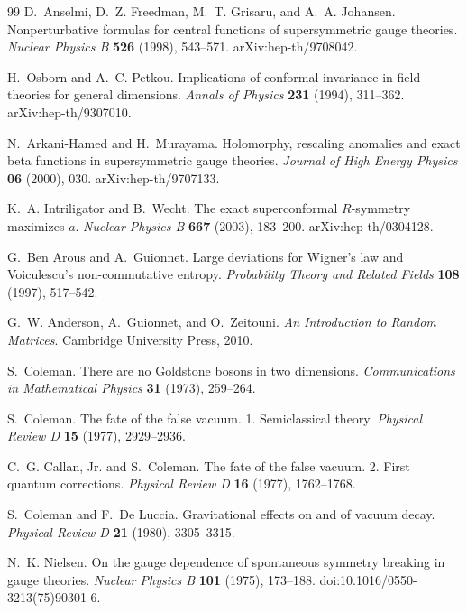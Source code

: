 \begin{thebibliography}{99}
D.~Anselmi, D.~Z. Freedman, M.~T. Grisaru, and A.~A. Johansen.
Nonperturbative formulas for central functions of supersymmetric gauge
theories.
\emph{Nuclear Physics B} \textbf{526} (1998), 543--571.
arXiv:hep-th/9708042.

H.~Osborn and A.~C. Petkou.
Implications of conformal invariance in field theories for general dimensions.
\emph{Annals of Physics} \textbf{231} (1994), 311--362.
arXiv:hep-th/9307010.

N.~Arkani-Hamed and H.~Murayama.
Holomorphy, rescaling anomalies and exact beta functions in supersymmetric
gauge theories.
\emph{Journal of High Energy Physics} \textbf{06} (2000), 030.
arXiv:hep-th/9707133.

K.~A. Intriligator and B.~Wecht.
The exact superconformal \(R\)-symmetry maximizes \(a\).
\emph{Nuclear Physics B} \textbf{667} (2003), 183--200.
arXiv:hep-th/0304128.

G.~Ben Arous and A.~Guionnet.
Large deviations for Wigner's law and Voiculescu's non-commutative entropy.
\emph{Probability Theory and Related Fields} \textbf{108} (1997), 517--542.

G.~W. Anderson, A.~Guionnet, and O.~Zeitouni.
\emph{An Introduction to Random Matrices}.
Cambridge University Press, 2010.

S.~Coleman.
There are no Goldstone bosons in two dimensions.
\emph{Communications in Mathematical Physics} \textbf{31} (1973), 259--264.

S.~Coleman.
The fate of the false vacuum. 1. Semiclassical theory.
\emph{Physical Review D} \textbf{15} (1977), 2929--2936.

C.~G. Callan, Jr. and S.~Coleman.
The fate of the false vacuum. 2. First quantum corrections.
\emph{Physical Review D} \textbf{16} (1977), 1762--1768.

S.~Coleman and F.~De Luccia.
Gravitational effects on and of vacuum decay.
\emph{Physical Review D} \textbf{21} (1980), 3305--3315.

N.~K. Nielsen.
On the gauge dependence of spontaneous symmetry breaking in gauge theories.
\emph{Nuclear Physics B} \textbf{101} (1975), 173--188.
doi:10.1016/0550-3213(75)90301-6.


\end{thebibliography}
